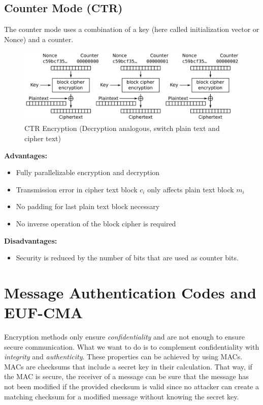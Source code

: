 \subsection{Counter Mode (CTR)}

The counter mode uses a combination of a key (here called initialization vector or Nonce) and a counter.

\begin{figure}[H]
    \center
    \includegraphics[width=\linewidth]{gfx/enc_ctr.png}
    \caption{CTR Encryption (Decryption analogous, switch plain text and cipher text)}
    \label{fig:ctr_enc}
\end{figure}

\textbf{Advantages:}

\begin{itemize}
    \item Fully parallelizable encryption and decryption
    \item Transmission error in cipher text block $c_i$ only affects plain text block $m_i$
    \item No padding for last plain text block necessary
    \item No inverse operation of the block cipher is required
\end{itemize}

\textbf{Disadvantages:}

\begin{itemize}
    \item Security is reduced by the number of bits that are used as counter bits.
\end{itemize}

\section{Message Authentication Codes and EUF-CMA}

Encryption methods only ensure \emph{confidentiality} and are not enough to ensure secure communication. What we want to do is to complement confidentiality with \emph{integrity} and \emph{authenticity}. These properties can be achieved by using \acp{MAC}. \acp{MAC} are checksums that include a secret key in their calculation. That way, if the \ac{MAC} is secure, the receiver of a message can be sure that the message has not been modified if the provided checksum is valid since no attacker can create a matching checksum for a modified message without knowing the secret key.


